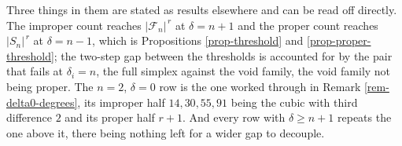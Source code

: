 \documentclass[11pt, a4paper, abstract=yes]{scrartcl}
\theoremstyle{definition}
\theoremstyle{remark}
\theoremstyle{plain}
\begin{document}
Three things in them are stated as results elsewhere and can be read off directly. The improper
count reaches \(\lvert\mathcal F_n\rvert^{\,r}\) at \(\delta=n+1\) and the proper count reaches
\(\lvert S_n\rvert^{\,r}\) at \(\delta=n-1\), which is Propositions \ref{prop-threshold} and
\ref{prop-proper-threshold}; the two-step gap between the thresholds is accounted for by the pair
that fails at \(\delta_i=n\), the full simplex against the void family, the void family not being
proper. The \(n=2\), \(\delta=0\) row is the one worked through in
Remark \ref{rem-delta0-degrees}, its improper half \(14,30,55,91\) being the cubic with third
difference \(2\) and its proper half \(r+1\). And every row with \(\delta\ge n+1\) repeats the one
above it, there being nothing left for a wider gap to decouple.

\begingroup\footnotesize
\end{document}
